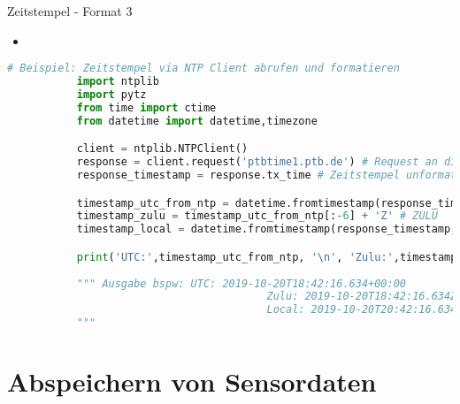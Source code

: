 \begin{frame}[fragile]{Zeitstempel - Format 3}
    \begin{itemize}
        \setlength{\itemindent}{2.4in}
        \item [\textbf{}]
    \end{itemize}

  \begin{lstlisting}[language=Python, gobble=8]
        # Beispiel: Zeitstempel via NTP Client abrufen und formatieren           
           import ntplib
           import pytz
           from time import ctime
           from datetime import datetime,timezone

           client = ntplib.NTPClient()
           response = client.request('ptbtime1.ptb.de') # Request an die Physikalisch Technische Bundesanstalt (PTB) in Braunschweig 
           response_timestamp = response.tx_time # Zeitstempel unformatiert als float

           timestamp_utc_from_ntp = datetime.fromtimestamp(response_timestamp, timezone.utc).isoformat(timespec='milliseconds') # UTC
           timestamp_zulu = timestamp_utc_from_ntp[:-6] + 'Z' # ZULU
           timestamp_local = datetime.fromtimestamp(response_timestamp, pytz.timezone('Europe/Berlin')).isoformat(timespec='milliseconds') # +2 Stunden Offset

           print('UTC:',timestamp_utc_from_ntp, '\n', 'Zulu:',timestamp_zulu, '\n', 'Local:',timestamp_local)
           
           """ Ausgabe bspw: UTC: 2019-10-20T18:42:16.634+00:00 
                                         Zulu: 2019-10-20T18:42:16.634Z 
                                         Local: 2019-10-20T20:42:16.634+02:00 
           """
        \end{lstlisting}

\end{frame}


\section{Abspeichern von Sensordaten}


